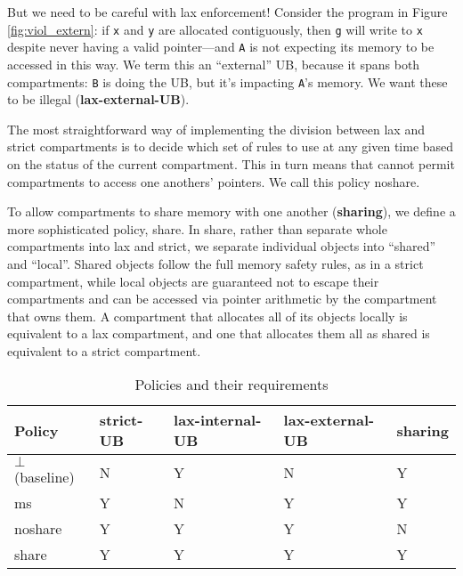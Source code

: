 \documentclass{article}
\begin{document}
But we need to be careful with lax enforcement! Consider the program in
Figure \ref{fig:viol_extern}: if {\tt x} and {\tt y} are allocated contiguously,
then {\tt g} will write to {\tt x} despite never having a valid pointer---and
{\tt A} is not expecting its memory to be accessed in this way.
We term this an ``external'' UB, because it spans both compartments: {\tt B} is doing
the UB, but it's impacting {\tt A}'s memory. We want these to be illegal
({\bf lax-external-UB}).

The most straightforward way of implementing the division between lax and strict compartments
is to decide which set of rules to use at any given time based on the status of the current
compartment. This in turn means that cannot permit compartments to access one anothers' pointers.
We call this policy {\sc noshare}.

To allow compartments to share memory with one another ({\bf sharing}), we define a more
sophisticated policy, {\sc share}. In {\sc share}, rather than separate whole compartments into
lax and strict, we
separate individual objects into ``shared'' and ``local''. Shared objects follow the full
memory safety rules, as in a strict compartment, while local objects are guaranteed not to
escape their compartments and can be accessed via pointer arithmetic by the compartment that
owns them. A compartment that allocates all of its objects locally is equivalent to a lax
compartment, and one that allocates them all as shared is equivalent to a strict compartment.

\begin{table}
  \begin{tabular}{|l|l|l|l|l|}
    \hline
    Policy & {\bf strict-UB} & {\bf lax-internal-UB} & {\bf lax-external-UB} & {\bf sharing} \\
    \hline
    \(\bot\) (baseline) & {\color{red} N} & {\color{green} Y} & {\color{red} N} & {\color{green} Y} \\
    {\sc ms} & {\color{green} Y} & {\color{red} N} & {\color{green} Y} & {\color{green} Y} \\
    {\sc noshare} & {\color{green} Y} & {\color{green} Y} & {\color{green} Y} & {\color{red} N} \\
    {\sc share} & {\color{green} Y} & {\color{green} Y} & {\color{green} Y} & {\color{green} Y} \\
    \hline
  \end{tabular}
  \caption{Policies and their requirements}
  \label{tab:reqs}
\end{table}
\end{document}
